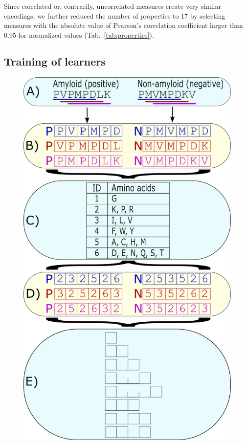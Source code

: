 \documentclass[a4,center,fleqn]{NAR}
\begin{document}
  Since correlated or, contrarily, uncorrelated measures create very similar 
%
%
%
encodings, we further reduced the number of properties to 17 by selecting 
%
%
%
measures with the absolute value of Pearson's correlation coefficient larger 
than 0.95 for normalized values (Tab.~\ref{tab:properties}).

\subsection{Training of learners}

\begin{figure}[!tpb]
\centering
    \includegraphics[width=\columnwidth]{figures/ngram_scheme.png}

\end{figure}
\end{document}
